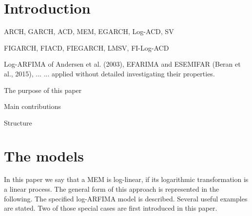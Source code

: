 \documentclass[12pt]{article}
\begin{document}
\newpage

\section{Introduction}

ARCH, GARCH, ACD, MEM, EGARCH, Log-ACD, SV


FIGARCH, FIACD, FIEGARCH, LMSV, FI-Log-ACD

Log-ARFIMA of Andersen et al. (2003), EFARIMA and ESEMIFAR (Beran et al., 2015), ... ... applied without detailed investigating their properties.  



The purpose of this paper


Main contributions





Structure









\newpage

\section{The models}

In this paper we say that a MEM is log-linear, if its logarithmic transformation is a linear process. The general form of this approach is represented in the following. The specified log-ARFIMA model is described. Several useful examples are stated. Two of those special cases are first introduced in this paper. 
\end{document}
